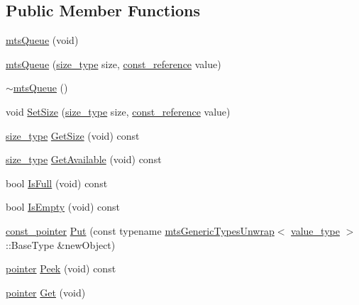 \subsection*{Public Member Functions}
\begin{DoxyCompactItemize}
\item 
\hyperlink{classmts_queue_ad2d912c1cda4d077291d9b95fc4272e3}{mts\-Queue} (void)
\item 
\hyperlink{classmts_queue_adacea56ce5d53bee10e50c47ade45140}{mts\-Queue} (\hyperlink{classmts_queue_a41b33537b89ae654421ba5e7c9893ed2}{size\-\_\-type} size, \hyperlink{classmts_queue_a3ae67f8b6cdb9686e5fca9ed1740290e}{const\-\_\-reference} value)
\item 
\hyperlink{classmts_queue_a0278e7a778a29113976eb23cb21b8791}{$\sim$mts\-Queue} ()
\item 
void \hyperlink{classmts_queue_ad273e5adfc7842ee91c329d533ebeac6}{Set\-Size} (\hyperlink{classmts_queue_a41b33537b89ae654421ba5e7c9893ed2}{size\-\_\-type} size, \hyperlink{classmts_queue_a3ae67f8b6cdb9686e5fca9ed1740290e}{const\-\_\-reference} value)
\item 
\hyperlink{classmts_queue_a41b33537b89ae654421ba5e7c9893ed2}{size\-\_\-type} \hyperlink{classmts_queue_abac749440695cd9b716928a32de068fd}{Get\-Size} (void) const 
\item 
\hyperlink{classmts_queue_a41b33537b89ae654421ba5e7c9893ed2}{size\-\_\-type} \hyperlink{classmts_queue_aa33751fddc4d9f95d93985feb4322659}{Get\-Available} (void) const 
\item 
bool \hyperlink{classmts_queue_a26f919b9a57cd8f07de077ea9b9b3af5}{Is\-Full} (void) const 
\item 
bool \hyperlink{classmts_queue_a20a006bdb4a95beca2c4dd1104c9bfbf}{Is\-Empty} (void) const 
\item 
\hyperlink{classmts_queue_a1224d9a0146fab27bdb1db050288acb4}{const\-\_\-pointer} \hyperlink{classmts_queue_abb9c17c7303935d91b0be7cd1e790e2f}{Put} (const typename \hyperlink{classmts_generic_types_unwrap}{mts\-Generic\-Types\-Unwrap}$<$ \hyperlink{classmts_queue_a041a2b244150e58247ee55039e0bb00f}{value\-\_\-type} $>$\-::Base\-Type \&new\-Object)
\item 
\hyperlink{classmts_queue_a66d423ede5c12e015a4e070e1bc23f43}{pointer} \hyperlink{classmts_queue_a5c85908b63b0fca770024985458a6951}{Peek} (void) const 
\item 
\hyperlink{classmts_queue_a66d423ede5c12e015a4e070e1bc23f43}{pointer} \hyperlink{classmts_queue_a0fc8b5ffe209a54d13de0e51313341c9}{Get} (void)
\end{DoxyCompactItemize}
